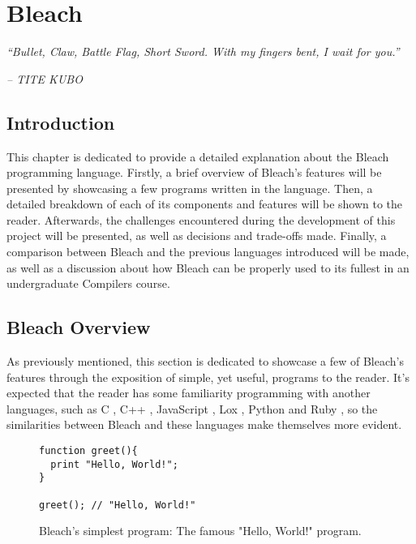 \chapter{Bleach} \label{cap:metodologia}

\begin{displayquote}
    \begin{center}
        \textit{``Bullet, Claw, Battle Flag, Short Sword. With my fingers bent, I wait for you.''}
    \end{center}
\end{displayquote}

\begin{flushright}
   \textit{-- TITE KUBO}
\end{flushright}

\section{Introduction}
This chapter is dedicated to provide a detailed explanation about the Bleach programming language. Firstly, a brief overview of Bleach's features will be presented by showcasing a few programs written in the language. Then, a detailed breakdown of each of its components and features will be shown to the reader. Afterwards, the challenges encountered during the development of this project will be presented, as well as decisions and trade-offs made. Finally, a comparison between Bleach and the previous languages introduced will be made, as well as a discussion about how Bleach can be properly used to its fullest in an undergraduate Compilers course.

\section{Bleach Overview}
As previously mentioned, this section is dedicated to showcase a few of Bleach's features through the exposition of simple, yet useful, programs to the reader. It's expected that the reader has some familiarity programming with another languages, such as C \cite{kernighan1988c}, C++ \cite{strousrup2000c++}, JavaScript \cite{javascript_language}, Lox \cite{nystrom2021crafting}, Python \cite{python_language} and Ruby \cite{ruby_language}, so the similarities between Bleach and these languages make themselves more evident. \newline

\begin{figure}
    \centering
    \begin{lstlisting}
function greet(){
  print "Hello, World!";
}

greet(); // "Hello, World!"
    \end{lstlisting}
    \caption{Bleach's simplest program: The famous "Hello, World!" program.}
\end{figure}

